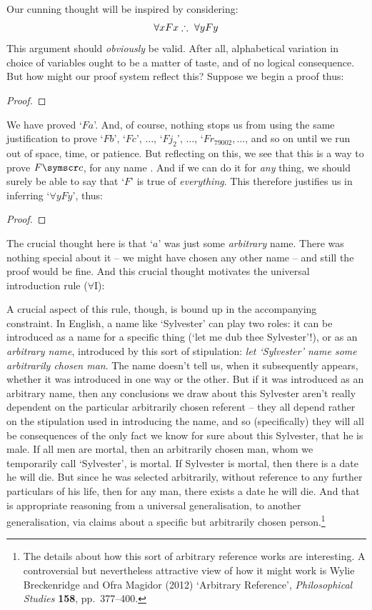 Our cunning thought will be inspired by considering:
$$\forall x Fx \mathrel{\therefore}\ \forall y Fy$$
This argument should \emph{obviously} be valid. After all, alphabetical variation in choice of variables ought to be a matter of taste, and of no logical consequence. But how might our proof system reflect this? Suppose we begin a proof thus:
\begin{proof}
	 
\end{proof}
We have proved `$Fa$'. And, of course, nothing stops us from using the same justification to prove `$Fb$', `$Fc$', $…$, `$Fj_2$', $…$, `$Fr_{79002}, …$, and so on until we run out of space, time, or patience. But reflecting on this, we see that this is a way to prove $F\meta{c}$, for any name . And if we can do it for \emph{any} thing, we should surely be able to say that `$F$' is true of \emph{everything}. This therefore justifies us in inferring `$\forall y Fy$', thus:
\begin{proof}
	 
	 
\end{proof}
The crucial thought here is that `$a$' was just some \emph{arbitrary} name. There was nothing special about it – we might have chosen any other name – and still the proof would be fine. And this crucial thought motivates the universal introduction rule ($\forall$I):

A crucial aspect of this rule, though, is bound up in the accompanying constraint. In English, a name like `Sylvester' can play two roles: it can be introduced as a name for a specific thing (`let me dub thee Sylvester'!), or as an \emph{arbitrary name}, introduced by this sort of stipulation: \emph{let `Sylvester' name some arbitrarily chosen man}. The name doesn't tell us, when it subsequently appears, whether it was introduced in one way or the other. But if it was introduced as an arbitrary name, then any conclusions we draw about this Sylvester aren't really dependent on the particular arbitrarily chosen referent – they all depend rather on the stipulation used in introducing the name, and so (specifically) they will all be consequences of the only fact we know for sure about this Sylvester, that he is male. If all men are mortal, then an arbitrarily chosen man, whom we temporarily call `Sylvester', is mortal. If Sylvester is mortal, then there is a date he will die. But since he was selected arbitrarily, without reference to any further particulars of his life, then for any man, there exists a date he will die. And that is appropriate reasoning from a universal generalisation, to another generalisation, via claims about a specific but arbitrarily chosen person.\footnote{The details about how this sort of arbitrary reference works are interesting. A controversial but nevertheless attractive view of how it might work is  Wylie Breckenridge and Ofra Magidor (2012) `Arbitrary Reference', \emph{Philosophical Studies} \textbf{158}, pp.\ 377–400.}

